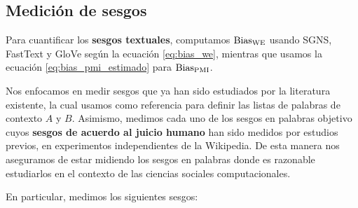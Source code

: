 
\subsection{Medición de sesgos}

Para cuantificar los \textbf{sesgos textuales}, computamos $\operatorname{Bias_{WE}}$ usando SGNS, FastText y GloVe según la ecuación \ref{eq:bias_we}, mientras que usamos la ecuación \ref{eq:bias_pmi_estimado} para $\operatorname{Bias_{PMI}}$. 

Nos enfocamos en medir sesgos que ya han sido estudiados por la literatura existente, la cual usamos como referencia para definir las listas de palabras de contexto $A$ y $B$. Asimismo, medimos cada uno de los sesgos en palabras objetivo cuyos \textbf{sesgos de acuerdo al juicio humano} han sido medidos por estudios previos, en experimentos independientes de la Wikipedia. De esta manera nos aseguramos de estar midiendo los sesgos en palabras donde es razonable estudiarlos en el contexto de las ciencias sociales computacionales.

En particular, medimos los siguientes sesgos:


